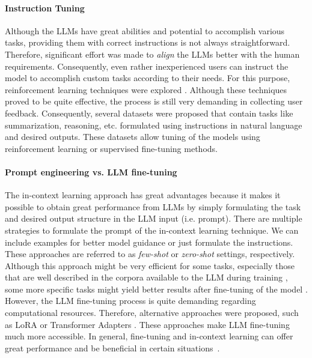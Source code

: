 \paragraph{Instruction Tuning}
Although the LLMs have great abilities and potential to accomplish various tasks, providing them with correct instructions is not always straightforward.
Therefore, significant effort was made to \emph{align} the LLMs better with the human requirements.
Consequently, even rather inexperienced users can instruct the model to accomplish custom tasks according to their needs.
For this purpose, reinforcement learning techniques were explored \cite{ziegler2019fine,ouyang2022training}.
Although these techniques proved to be quite effective, the process is still very demanding in collecting user feedback.
Consequently, several datasets were proposed \cite{supernaturalinstructions,black2022gpt} that contain tasks like summarization, reasoning, etc. formulated using instructions in natural language and desired outputs.
These datasets allow tuning of the models using reinforcement learning or supervised fine-tuning methods.

\paragraph{Prompt engineering vs. LLM fine-tuning}
\label{02:in-context}
The in-context learning approach has great advantages because it makes it possible to obtain great performance from LLMs by simply formulating the task and desired output structure in the LLM input (i.e. prompt).
There are multiple strategies to formulate the prompt of the in-context learning technique.
We can include examples for better model guidance or just formulate the instructions.
These approaches are referred to as \emph{few-shot} or \emph{zero-shot} settings, respectively.
Although this approach might be very efficient for some tasks, especially those that are well described in the corpora available to the LLM during training \cite{wei2022emergent}, some more specific tasks might yield better results after fine-tuning of the model \cite{tu-etal-2022-prompt}.
However, the LLM fine-tuning process is quite demanding regarding computational resources.
Therefore, alternative approaches were proposed, such as LoRA \cite{hu2021lora} or Transformer Adapters \cite{pfeiffer2020AdapterHub}.
These approaches make LLM fine-tuning much more accessible.
In general, fine-tuning and in-context learning can offer great performance and be beneficial in certain situations~\cite{mosbach-etal-2023-shot}.


